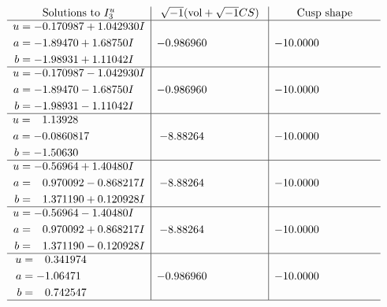 \documentclass[1p]{elsarticle_modified}
\theoremstyle{definition}
\newcommand{\I}{\sqrt{-1}}
\begin{document}
$$\begin{array}{c|c|c}  
\text{Solutions to }I^u_{3}& \I (\text{vol} + \sqrt{-1}CS) & \text{Cusp shape}\\
 \hline 
\begin{aligned}
u &= -0.170987 + 1.042930 I \\
a &= -1.89470 + 1.68750 I \\
b &= -1.98931 + 1.11042 I\end{aligned}
 & -0.986960\phantom{ +0.000000I} & -10.0000\phantom{ +0.000000I} \\ \hline\begin{aligned}
u &= -0.170987 - 1.042930 I \\
a &= -1.89470 - 1.68750 I \\
b &= -1.98931 - 1.11042 I\end{aligned}
 & -0.986960\phantom{ +0.000000I} & -10.0000\phantom{ +0.000000I} \\ \hline\begin{aligned}
u &= \phantom{-}1.13928\phantom{ +0.000000I} \\
a &= -0.0860817\phantom{ +0.000000I} \\
b &= -1.50630\phantom{ +0.000000I}\end{aligned}
 & -8.88264\phantom{ +0.000000I} & -10.0000\phantom{ +0.000000I} \\ \hline\begin{aligned}
u &= -0.56964 + 1.40480 I \\
a &= \phantom{-}0.970092 - 0.868217 I \\
b &= \phantom{-}1.371190 + 0.120928 I\end{aligned}
 & -8.88264\phantom{ +0.000000I} & -10.0000\phantom{ +0.000000I} \\ \hline\begin{aligned}
u &= -0.56964 - 1.40480 I \\
a &= \phantom{-}0.970092 + 0.868217 I \\
b &= \phantom{-}1.371190 - 0.120928 I\end{aligned}
 & -8.88264\phantom{ +0.000000I} & -10.0000\phantom{ +0.000000I} \\ \hline\begin{aligned}
u &= \phantom{-}0.341974\phantom{ +0.000000I} \\
a &= -1.06471\phantom{ +0.000000I} \\
b &= \phantom{-}0.742547\phantom{ +0.000000I}\end{aligned}
 & -0.986960\phantom{ +0.000000I} & -10.0000\phantom{ +0.000000I}\\
 \hline 
 \end{array}$$\newpage
\end{document}
